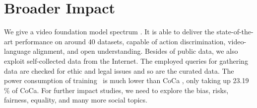 \section{Broader Impact}

We give a video foundation model spectrum \model. It is able to deliver the state-of-the-art performance on around 40 datasets, capable of action discrimination, video-language alignment, and open understanding. Besides of public data, we also exploit self-collected data from the Internet. The employed queries for gathering data are checked for ethic and legal issues and so are the curated data. The power consumption of training \model~is much lower than CoCa \cite{coca}, only taking up 23.19 \% of CoCa. For further impact studies, we need to explore the bias, risks, fairness, equality, and many more social topics.